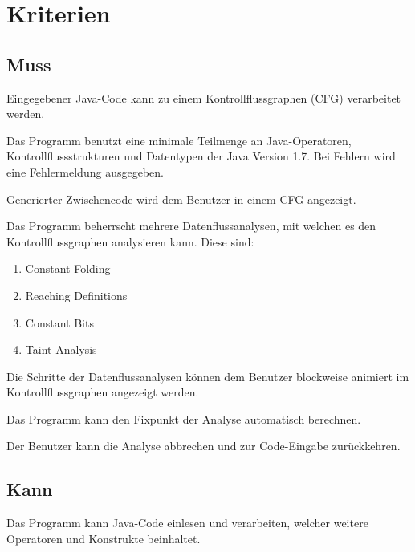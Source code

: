 
\section{Kriterien}

\subsection{Muss}

Eingegebener Java-Code kann zu einem Kontrollflussgraphen (CFG) verarbeitet werden.

Das Programm benutzt eine minimale Teilmenge an Java-Operatoren, Kontrollflussstrukturen und Datentypen der Java Version 1.7. Bei Fehlern wird eine Fehlermeldung ausgegeben.

Generierter Zwischencode wird dem Benutzer in einem CFG angezeigt.

Das Programm beherrscht mehrere Datenflussanalysen, mit welchen es den Kontrollflussgraphen analysieren kann.
Diese sind:\par
\begin{enumerate}[label=(\alph*)]
\item Constant Folding
\item Reaching Definitions
\item Constant Bits
\item Taint Analysis
\end{enumerate}

Die Schritte der Datenflussanalysen können dem Benutzer blockweise animiert im Kontrollflussgraphen angezeigt werden.

Das Programm kann den Fixpunkt der Analyse automatisch berechnen.

Der Benutzer kann die Analyse abbrechen und zur Code-Eingabe zurückkehren.

\subsection{Kann}

Das Programm kann Java-Code einlesen und verarbeiten, welcher weitere Operatoren und Konstrukte beinhaltet.

